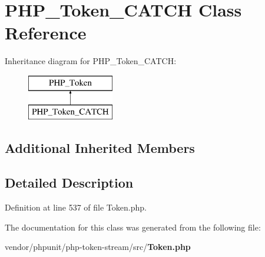 \section{P\+H\+P\+\_\+\+Token\+\_\+\+C\+A\+T\+C\+H Class Reference}
\label{class_p_h_p___token___c_a_t_c_h}
Inheritance diagram for P\+H\+P\+\_\+\+Token\+\_\+\+C\+A\+T\+C\+H\+:\begin{figure}[H]
\begin{center}
\leavevmode
\includegraphics[height=2.000000cm]{class_p_h_p___token___c_a_t_c_h}
\end{center}
\end{figure}
\subsection*{Additional Inherited Members}


\subsection{Detailed Description}


Definition at line 537 of file Token.\+php.



The documentation for this class was generated from the following file\+:\begin{DoxyCompactItemize}
\item 
vendor/phpunit/php-\/token-\/stream/src/{\bf Token.\+php}\end{DoxyCompactItemize}
